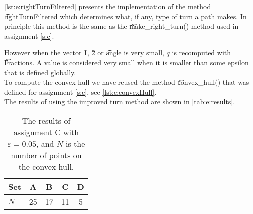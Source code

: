 \autoref{lst:e:rightTurnFiltered} presents the implementation of the method \t{rightTurnFiltered} which determines what, if any, type of turn a path makes. In principle this method is the same as the \t{make_right_turn()} method used in assignment \ref{s:c}. 

However when the vector \v{1}, \v{2} or \t{angle} is very small, $q$ is recomputed with \t{Fraction}s. A value is considered very small when it is smaller than some epsilon that is defined globally. \\

To compute the convex hull we have reused the method \t{convex_hull()} that was defined for assignment \ref{s:c}, see \autoref{lst:e:convexHull}.\\

The results of using the improved turn method are shown in \autoref{tab:e:results}.

\begin{table}
	\centering
	\begin{tabular}{l|cccc}
	Set & A		&	B	&	C	&	D\\
	\hline
	$N$	& 25	&	17	&	11	&	5\\
	\end{tabular}
	\caption{The results of assignment C with $\varepsilon = 0.05$, and $N$ is the number of points on the convex hull.}
	\label{tab:e:results}
\end{table}



